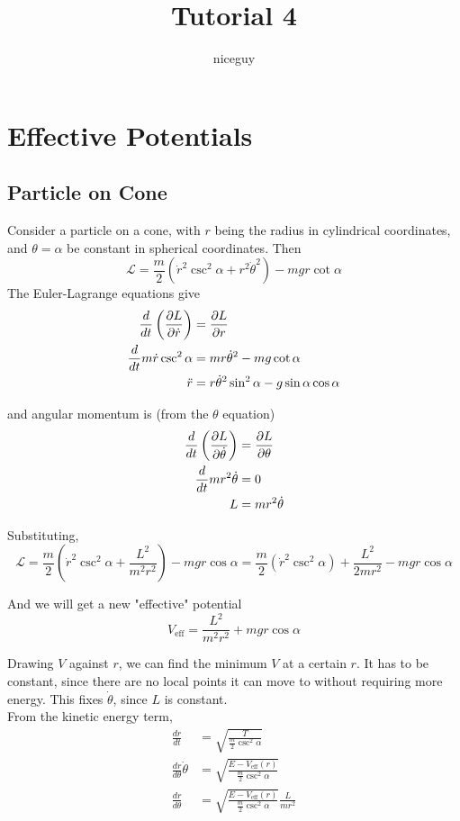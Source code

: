 \documentclass[12pt]{article}
\title{Tutorial 4}
\author{niceguy}
\begin{document}
\maketitle

\section{Effective Potentials}

\subsection{Particle on Cone}

Consider a particle on a cone, with $r$ being the radius in cylindrical coordinates, and $\theta = \alpha$ be constant in spherical coordinates. Then
$$\mathcal L = \frac{m}{2}(\dot r^2\csc^2\alpha + r^2\dot\theta^2) - mgr\cot\alpha$$
The Euler-Lagrange equations give
\begin{align*}
    \frac{d}{dt} \left(\frac{\partial L}{\partial \dot r}\right) &= \frac{\partial L}{\partial r} \\
    \frac{d}{dt} m\dot r\csc^2\alpha &= mr\dot\theta^2 - mg\cot\alpha \\
    \ddot r &= r\dot\theta^2\sin^2\alpha - g\sin\alpha\cos\alpha \\
\end{align*}

and angular momentum is (from the $\theta$ equation)
\begin{align*}
    \frac{d}{dt} \left(\frac{\partial L}{\partial \dot\theta}\right) &= \frac{\partial L}{\partial \theta} \\
    \frac{d}{dt} mr^2\dot\theta &= 0 \\
    L &= mr^2\dot\theta
\end{align*}

Substituting,
$$\mathcal L = \frac{m}{2}\left(\dot r^2\csc^2\alpha + \frac{L^2}{m^2r^2}\right) - mgr\cos\alpha = \frac{m}{2}(\dot r^2\csc^2\alpha) + \frac{L^2}{2mr^2} - mgr\cos\alpha$$

And we will get a new "effective" potential
$$V_{\text{eff}} = \frac{L^2}{m^2r^2} + mgr\cos\alpha$$

Drawing $V$ against $r$, we can find the minimum $V$ at a certain $r$. It has to be constant, since there are no local points it can move to without requiring more energy. This fixes $\dot\theta$, since $L$ is constant. \\
From the kinetic energy term,
\begin{align*}
    \frac{dr}{dt} &= \sqrt{\frac{T}{\frac{m}{2}\csc^2\alpha}} \\
    \frac{dr}{d\theta} \dot\theta &= \sqrt{\frac{E - V_{\text{eff}}(r)}{\frac{m}{2}\csc^2\alpha}} \\
    \frac{dr}{d\theta} &= \sqrt{\frac{E - V_{\text{eff}}(r)}{\frac{m}{2}\csc^2\alpha}} \frac{L}{mr^2} \\
\end{align*}
\end{document}
